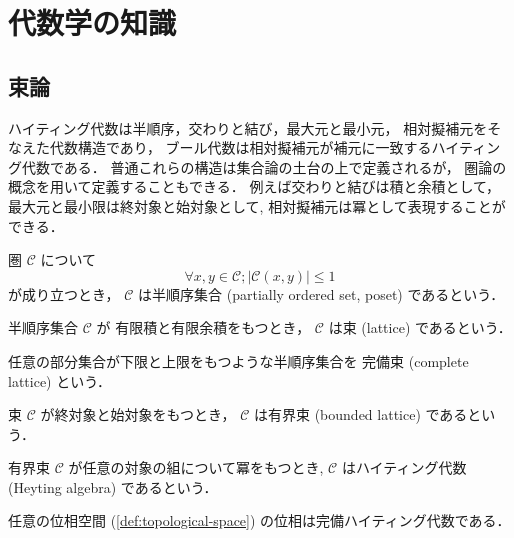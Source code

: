 \documentclass[titlepage]{ltjsreport}
\newcommand{\cat}[1]{\mathscr{#1}}
\newcommand{\objs}[1]{#1}
\newcommand{\mrps}[3]{#1(#2,#3)}
\begin{document}
\chapter{代数学の知識}

\section{束論}

ハイティング代数は半順序，交わりと結び，最大元と最小元，
相対擬補元をそなえた代数構造であり，
ブール代数は相対擬補元が補元に一致するハイティング代数である．
普通これらの構造は集合論の土台の上で定義されるが，
圏論の概念を用いて定義することもできる．
例えば交わりと結びは積と余積として，最大元と最小限は終対象と始対象として,
相対擬補元は冪として表現することができる．

\begin{definition}[半順序集合]
  圏 $\cat{C}$ について
  \begin{equation}
    \forall x,y\in\objs{\cat{C}};|\mrps{\cat{C}}{x}{y}|\le1
  \end{equation}
  が成り立つとき，
  $\cat{C}$ は半順序集合 (partially ordered set, poset)
  であるという．
\end{definition}

\begin{definition}[束]
  半順序集合 $\cat{C}$ が
  有限積と有限余積をもつとき，
  $\cat{C}$ は束 (lattice) であるという．
\end{definition}

\begin{definition}[完備束]\label{def:complete-lattice}%
  任意の部分集合が下限と上限をもつような半順序集合を
  完備束
  (complete lattice)
  という．
\end{definition}

\begin{definition}[有界束]
  束 $\cat{C}$ が終対象と始対象をもつとき，
  $\cat{C}$ は有界束 (bounded lattice) であるという．
\end{definition}

\begin{definition}[ハイティング代数]\label{def:heyting-algebra}%
  有界束 $\cat{C}$ が任意の対象の組について冪をもつとき,
  $\cat{C}$ はハイティング代数 (Heyting algebra) であるという．
\end{definition}

\begin{theorem}
  任意の位相空間 (\cref{def:topological-space})
  の位相は完備ハイティング代数である．
\end{theorem}
\end{document}
